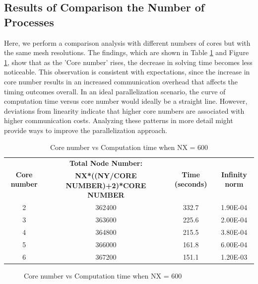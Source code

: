 \documentclass{article}
\begin{document}
\subsection{Results of Comparison the Number of Processes}
Here, we perform a comparison analysis with different numbers of cores but with the same mesh resolutions. The findings, which are shown in Table \ref{tab:veritablo_new} and Figure \ref{t4}, show that as the 'Core number' rises, the decrease in solving time becomes less noticeable. This observation is consistent with expectations, since the increase in core number results in an increased communication overhead that affects the timing outcomes overall. In an ideal parallelization scenario, the curve of computation time versus core number would ideally be a straight line. However, deviations from linearity indicate that higher core numbers are associated with higher communication costs. Analyzing these patterns in more detail might provide ways to improve the parallelization approach. 
\begin{table}[h]
    \centering
    \begin{tabular}{|c|c|c|c|}
        \hline
        \multirow{2}{*}{\textbf{Core number}} & \textbf{Total Node Number: }  & \multirow{2}{*}{\textbf{Time (seconds)}} &  \multirow{2}{*}{\textbf{Infinity norm}} \\
        &\textbf{NX*((NY/CORE NUMBER)+2)*CORE NUMBER} & & \\
        \hline
2	&	362400	&	332.7	&	1.90E-04	\\
3	&	363600	&	225.6	&	2.00E-04	\\
4	&	364800	&	215.5	&	3.80E-04	\\
5	&	366000	&	161.8	&	6.00E-04	\\
6	&	367200	&	151.1	&	1.20E-03	\\

        \hline
    \end{tabular}
    \caption{Core number vs Computation time when NX = 600 }
    \label{tab:veritablo_new}
\end{table}

\begin{figure}[hbt!]
  \centering
  \caption{Core number vs Computation time when NX = 600}
  \label{t4}
\end{figure}
\end{document}

